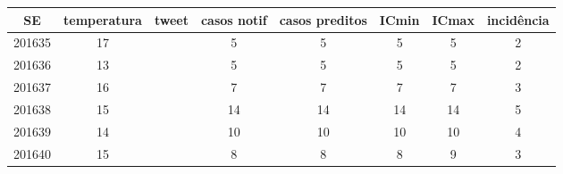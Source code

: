 \begin{tabular}{c|ccccccc}
  \hline
SE & temperatura & tweet & casos notif & casos preditos & ICmin & ICmax & incidência \\ 
  \hline
201635 & 17 &  & 5 & 5 & 5 & 5 & 2 \\ 
  201636 & 13 &  & 5 & 5 & 5 & 5 & 2 \\ 
  201637 & 16 &  & 7 & 7 & 7 & 7 & 3 \\ 
  201638 & 15 &  & 14 & 14 & 14 & 14 & 5 \\ 
  201639 & 14 &  & 10 & 10 & 10 & 10 & 4 \\ 
  201640 & 15 &  & 8 & 8 & 8 & 9 & 3 \\ 
   \hline
\end{tabular}
